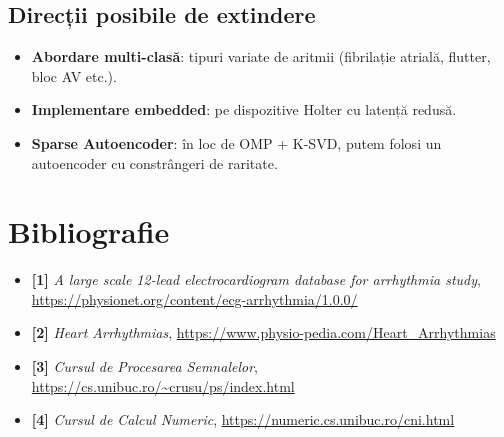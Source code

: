 \documentclass[12pt]{article}  %
\begin{document}
\subsection*{Direcții posibile de extindere}
\begin{itemize}
    \item \textbf{Abordare multi-clasă}: tipuri variate de aritmii (fibrilație atrială, flutter, bloc AV etc.).
    \item \textbf{Implementare embedded}: pe dispozitive Holter cu latență redusă.
    \item \textbf{Sparse Autoencoder}: în loc de OMP + K-SVD, putem folosi un autoencoder cu constrângeri de raritate.
\end{itemize}

\section*{Bibliografie}
\begin{itemize}
    \item \textbf{[1]} \emph{A large scale 12-lead electrocardiogram database for arrhythmia study}, \url{https://physionet.org/content/ecg-arrhythmia/1.0.0/}
    \item \textbf{[2]} \emph{Heart Arrhythmias}, \url{https://www.physio-pedia.com/Heart_Arrhythmias}
    \item \textbf{[3]} \emph{Cursul de Procesarea Semnalelor}, \url{https://cs.unibuc.ro/~crusu/ps/index.html}
    \item \textbf{[4]} \emph{Cursul de Calcul Numeric}, \url{https://numeric.cs.unibuc.ro/cni.html}
\end{itemize}
\end{document}
